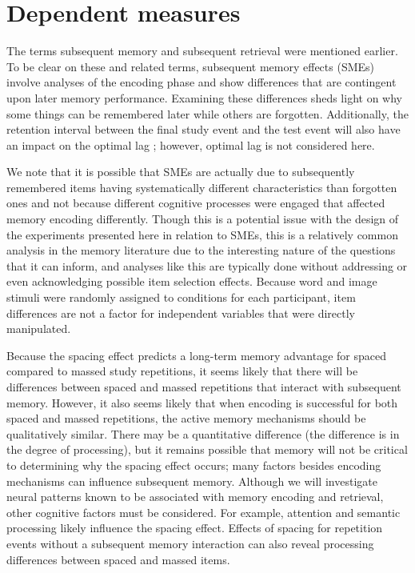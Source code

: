
\chapter{Dependent measures}

The terms subsequent memory and subsequent retrieval were mentioned earlier.  To be clear on these and related terms, subsequent memory effects (SMEs) involve analyses of the encoding phase and show differences that are contingent upon later memory performance.  Examining these differences sheds light on why some things can be remembered later while others are forgotten.
Additionally, the retention interval between the final study event and the test event will also have an impact on the optimal lag \cite{CepeEtal2006,Glen1976,Glen1977,Glen1979}; however, optimal lag is not considered here.

\cbstart
We note that it is possible that SMEs are actually due to subsequently remembered items having systematically different characteristics than forgotten ones and not because different cognitive processes were engaged that affected memory encoding differently.
Though this is a potential issue with the design of the experiments presented here in relation to SMEs, this is a relatively common analysis in the memory literature due to the interesting nature of the questions that it can inform, and analyses like this are typically done without addressing or even acknowledging possible item selection effects.
Because word and image stimuli were randomly assigned to conditions for each participant, item differences are not a factor for independent variables that were directly manipulated.
\cbend

Because the spacing effect predicts a long-term memory advantage for spaced compared to massed study repetitions, it seems likely that there will be differences between spaced and massed repetitions that interact with subsequent memory.  However, it also seems likely that when encoding is successful for both spaced and massed repetitions, the active memory mechanisms should be qualitatively similar.  There may be a quantitative difference (the difference is in the degree of processing), but it remains possible that memory will not be critical to determining why the spacing effect occurs; many factors besides encoding mechanisms can influence subsequent memory.  Although we will investigate neural patterns known to be associated with memory encoding and retrieval, other cognitive factors must be considered.  For example, attention and semantic processing likely influence the spacing effect.  Effects of spacing for repetition events without a subsequent memory interaction can also reveal processing differences between spaced and massed items.


